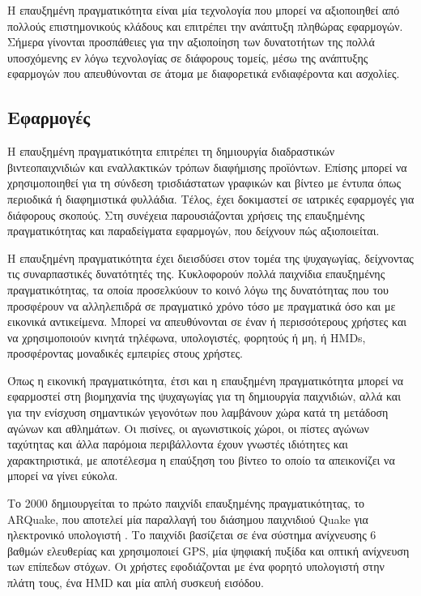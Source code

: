 Η επαυξημένη πραγματικότητα είναι μία τεχνολογία που μπορεί να αξιοποιηθεί από πολλούς επιστημονικούς κλάδους και επιτρέπει την ανάπτυξη πληθώρας εφαρμογών. Σήμερα γίνονται προσπάθειες για την αξιοποίηση των δυνατοτήτων της πολλά υποσχόμενης εν λόγω τεχνολογίας σε διάφορους τομείς, μέσω της ανάπτυξης εφαρμογών που απευθύνονται σε άτομα με διαφορετικά ενδιαφέροντα και ασχολίες.




\subsection{Εφαρμογές} \label{sec:apps}

Η επαυξημένη πραγματικότητα επιτρέπει τη δημιουργία διαδραστικών βιντεοπαιχνιδιών και εναλλακτικών τρόπων διαφήμισης προϊόντων. Επίσης μπορεί να χρησιμοποιηθεί για τη σύνδεση τρισδιάστατων γραφικών και βίντεο με έντυπα όπως περιοδικά ή διαφημιστικά φυλλάδια. Τέλος, έχει δοκιμαστεί σε ιατρικές εφαρμογές για διάφορους σκοπούς. Στη συνέχεια παρουσιάζονται χρήσεις της επαυξημένης πραγματικότητας και παραδείγματα εφαρμογών, που δείχνουν πώς αξιοποιείται.  




Η επαυξημένη πραγματικότητα έχει διεισδύσει στον τομέα της ψυχαγωγίας, δείχνοντας τις συναρπαστικές δυνατότητές της. Κυκλοφορούν πολλά παιχνίδια επαυξημένης πραγματικότητας, τα οποία προσελκύουν το κοινό λόγω της δυνατότητας που του προσφέρουν να αλληλεπιδρά σε πραγματικό χρόνο τόσο με πραγματικά όσο και με εικονικά αντικείμενα. Μπορεί να απευθύνονται σε έναν ή περισσότερους χρήστες και να χρησιμοποιούν κινητά τηλέφωνα, υπολογιστές, φορητούς ή μη, ή ΗΜDs, προσφέροντας μοναδικές εμπειρίες στους χρήστες. 


Όπως η εικονική πραγματικότητα, έτσι και η επαυξημένη πραγματικότητα μπορεί να εφαρμοστεί στη βιομηχανία της ψυχαγωγίας για τη δημιουργία παιχνιδιών, αλλά και για την ενίσχυση  σημαντικών γεγονότων που λαμβάνουν χώρα κατά τη μετάδοση αγώνων και αθλημάτων. Οι πισίνες, οι αγωνιστικοίς χώροι, οι πίστες αγώνων ταχύτητας και άλλα παρόμοια περιβάλλοντα έχουν γνωστές ιδιότητες και χαρακτηριστικά, με αποτέλεσμα η επαύξηση του βίντεο το οποίο τα απεικονίζει να μπορεί να γίνει εύκολα.


Το 2000 δημιουργείται το πρώτο παιχνίδι επαυξημένης πραγματικότητας, το ARQuake, που αποτελεί μία παραλλαγή του διάσημου παιχνιδιού Quake για ηλεκτρονικό υπολογιστή \cite{arquake}. Το παιχνίδι βασίζεται σε ένα σύστημα ανίχνευσης 6 βαθμών ελευθερίας και χρησιμοποιεί GPS, μία ψηφιακή πυξίδα και οπτική ανίχνευση των επίπεδων στόχων. Οι χρήστες εφοδιάζονται με ένα φορητό υπολογιστή στην πλάτη τους, ένα HMD και μία απλή συσκευή εισόδου.


